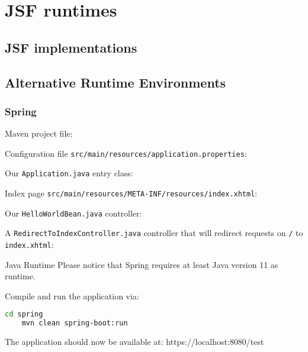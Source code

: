 %

\chapter{JSF runtimes}

\section{JSF implementations}

\section{Alternative Runtime Environments}

\subsection{Spring}

Maven project file:


Configuration file \texttt{src/main/resources/application.properties}:


Our \texttt{Application.java} entry class:


Index page \texttt{src/main/resources/META-INF/resources/index.xhtml}:


Our \texttt{HelloWorldBean.java} controller:


A \texttt{RedirectToIndexController.java} controller that will redirect requests on \texttt{/} to \texttt{index.xhtml}:


\begin{TIP}{Java Runtime}
	Please notice that Spring requires at least Java version 11 as runtime.
\end{TIP}

Compile and run the application via:
\begin{lstlisting}[language=bash]
	cd spring
	mvn clean spring-boot:run
\end{lstlisting}
The application should now be available at:
https://localhost:8080/test



